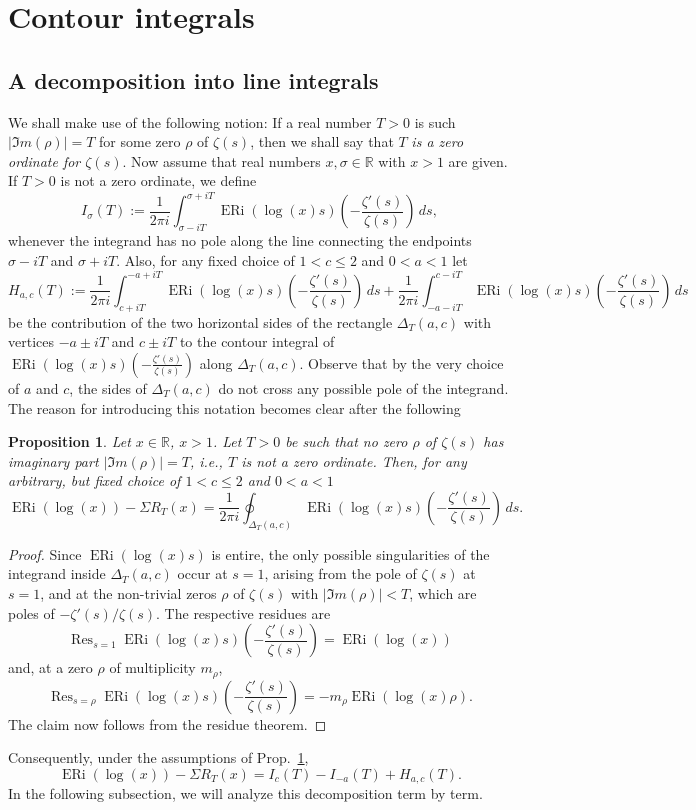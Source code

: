 \documentclass[a4paper,10pt]{amsart}
\DeclareMathOperator{\ERi}{ERi}
\newtheorem{proposition}[equation]{Proposition}
\theoremstyle{definition}
\numberwithin{equation}{section}
\def\R{\mathbb R}
\begin{document}
\section{Contour integrals}

\subsection{A decomposition into line integrals} We shall make use of the following notion: If a real number $T>0$ is such $|\Im m(\rho)|=T$ for some zero $\rho$ of $\zeta(s)$, then we shall say that $T$ {\it is a zero ordinate for $\zeta(s)$}. Now assume that real numbers $x,\sigma\in\R$ with $x>1$ are given. If $T>0$ is not a zero ordinate, we define
$$
I_\sigma(T):=\frac1{2\pi i}\int_{\sigma-iT}^{\sigma+iT}\ERi(\log(x) s)\left(-\frac{\zeta'(s)}{\zeta(s)}\right)\,ds,
$$
whenever the integrand has no pole along the line connecting the endpoints $\sigma-iT$ and $\sigma+iT$. Also, for any fixed choice of $1<c\le2$ and $0<a<1$ let
$$H_{a,c}(T):= \frac{1}{2\pi i} \int_{c+iT}^{-a+iT} \ERi(\log(x) s)\left(-\frac{\zeta'(s)}{\zeta(s)}\right)\,ds+ \frac{1}{2\pi i}\int_{-a-iT}^{c-iT} \ERi(\log(x) s)\left(-\frac{\zeta'(s)}{\zeta(s)}\right)\,ds
$$
be the contribution of the two horizontal sides of the rectangle $\Delta_T(a,c)$ with vertices $-a\pm iT$ and $c\pm iT$ to the contour integral of $\ERi(\log(x) s)\left(-\frac{\zeta'(s)}{\zeta(s)}\right)$ along $\Delta_T(a,c)$. Observe that by the very choice of $a$ and $c$, the sides of $\Delta_T(a,c)$ do not cross any possible pole of the integrand. The reason for introducing this notation becomes clear after the following



\begin{proposition}\label{lem:residue}
Let $x\in\R$, $x>1$. Let $T>0$ be such that no zero $\rho$ of $\zeta(s)$ has imaginary part
$|\Im m(\rho)|= T$, i.e., $T$ is not a zero ordinate. Then, for any arbitrary, but fixed choice of $1<c\le2$ and $0<a<1$
$$
\ERi(\log(x))-\Sigma R_T(x)=\frac{1}{2\pi i}\oint_{\Delta_T(a,c)} \ERi(\log(x) s)\left(-\frac{\zeta'(s)}{\zeta(s)}\right)\,ds.
$$
\end{proposition}

\begin{proof}
Since $\ERi(\log(x) s)$ is entire, the only possible singularities of the integrand inside $\Delta_T(a,c)$ occur at $s=1$, arising from the pole of $\zeta(s)$ at $s=1$, and at the non-trivial zeros $\rho$ of $\zeta(s)$ with $|\Im m(\rho)|<T$, which are poles of $-\zeta'(s)/\zeta(s)$. The respective residues are
$$
\operatorname{Res}_{s=1} \ERi(\log(x)s)\left(-\frac{\zeta'(s)}{\zeta(s)}\right)=\ERi(\log(x))
$$
and, at a zero $\rho$ of multiplicity $m_\rho$,
$$
\operatorname{Res}_{s=\rho} \ERi(\log(x)s)\left(-\frac{\zeta'(s)}{\zeta(s)}\right) =-m_\rho\ERi(\log(x)\rho).
$$
The claim now follows from the residue theorem.
\end{proof}
\noindent Consequently, under the assumptions of Prop.\ \ref{lem:residue}, 
\begin{equation}\label{eq:contour}
\ERi(\log(x))-\Sigma R_T(x)= I_c(T)-I_{-a}(T)+H_{a,c}(T).
\end{equation}
In the following subsection, we will analyze this decomposition term by term.
\end{document}

